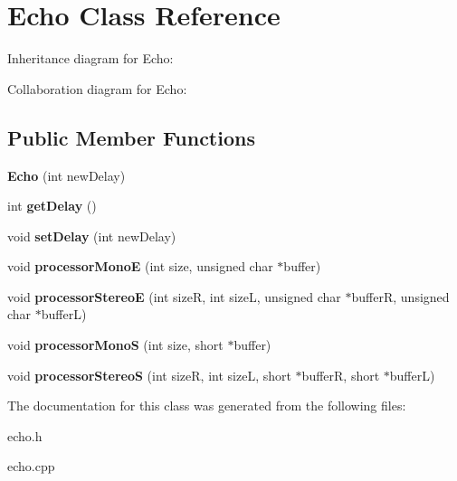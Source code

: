 \hypertarget{classEcho}{}\section{Echo Class Reference}
\label{classEcho}


Inheritance diagram for Echo\+:


Collaboration diagram for Echo\+:
\subsection*{Public Member Functions}
\begin{DoxyCompactItemize}
\item 
\mbox{\label{classEcho_a28d71de619dda9e6e51567a04bfb60d6}} 
{\bfseries Echo} (int new\+Delay)
\item 
\mbox{\label{classEcho_a57e19c9232f9bb96ccd78ba4bb68d6c9}} 
int {\bfseries get\+Delay} ()
\item 
\mbox{\label{classEcho_a3096c57223d6f7ce3097d15e8bf4a0ed}} 
void {\bfseries set\+Delay} (int new\+Delay)
\item 
\mbox{\label{classEcho_a472cc906604bcb493c6a6c1227436938}} 
void {\bfseries processor\+MonoE} (int size, unsigned char $\ast$buffer)
\item 
\mbox{\label{classEcho_a92aa2d47f32f5ad0f2cd45121e8d457f}} 
void {\bfseries processor\+StereoE} (int sizeR, int sizeL, unsigned char $\ast$bufferR, unsigned char $\ast$bufferL)
\item 
\mbox{\label{classEcho_a298f9fe12295c578737928544c46be1a}} 
void {\bfseries processor\+MonoS} (int size, short $\ast$buffer)
\item 
\mbox{\label{classEcho_a26ebcc62f7d6be2e3bd4ac1833636549}} 
void {\bfseries processor\+StereoS} (int sizeR, int sizeL, short $\ast$bufferR, short $\ast$bufferL)
\end{DoxyCompactItemize}


The documentation for this class was generated from the following files\+:\begin{DoxyCompactItemize}
\item 
echo.\+h\item 
echo.\+cpp\end{DoxyCompactItemize}
